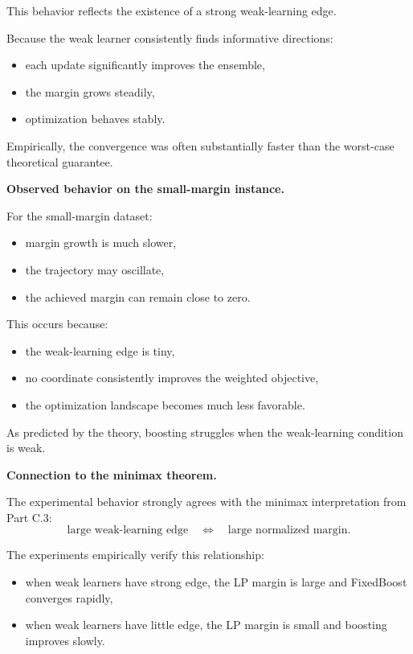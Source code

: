 \documentclass[11pt]{article}
\begin{document}
\begin{enumerate}
\begin{solutionbox}
This behavior reflects the existence of a strong weak-learning edge.

Because the weak learner consistently finds informative directions:
\begin{itemize}
    \item each update significantly improves the ensemble,
    \item the margin grows steadily,
    \item optimization behaves stably.
\end{itemize}

Empirically, the convergence was often substantially faster than the worst-case theoretical guarantee.

\medskip

\textbf{Observed behavior on the small-margin instance.}

For the small-margin dataset:
\begin{itemize}
    \item margin growth is much slower,
    \item the trajectory may oscillate,
    \item the achieved margin can remain close to zero.
\end{itemize}

This occurs because:
\begin{itemize}
    \item the weak-learning edge is tiny,
    \item no coordinate consistently improves the weighted objective,
    \item the optimization landscape becomes much less favorable.
\end{itemize}

As predicted by the theory, boosting struggles when the weak-learning condition is weak.

\medskip

\textbf{Connection to the minimax theorem.}

The experimental behavior strongly agrees with the minimax interpretation from Part C.3:
\[
\text{large weak-learning edge}
\quad\Longleftrightarrow\quad
\text{large normalized margin}.
\]

The experiments empirically verify this relationship:
\begin{itemize}
    \item when weak learners have strong edge, the LP margin is large and FixedBoost converges rapidly,
    \item when weak learners have little edge, the LP margin is small and boosting improves slowly.
\end{itemize}


\end{solutionbox}
\end{enumerate}
\end{document}
